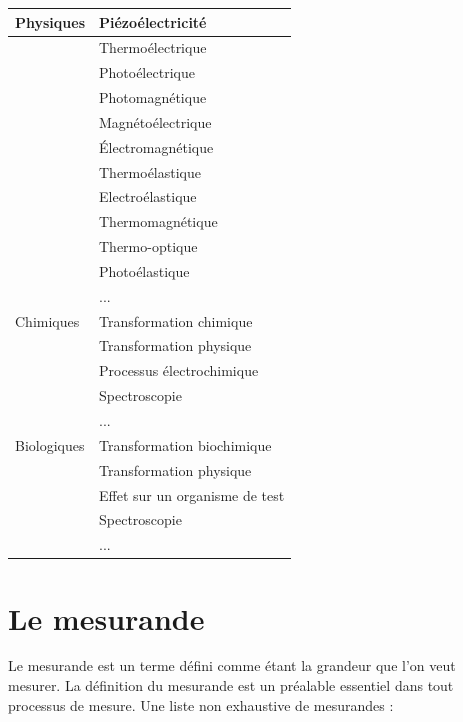 \begin {center}
\begin{tabular}{|p{4.2cm}|p{9.5cm}|}
\hline
Physiques &	Piézoélectricité \\
\hline
 & 	Thermoélectrique \\
\hline
  &	Photoélectrique \\
\hline
 & 	Photomagnétique \\
\hline
 & 	Magnétoélectrique \\
\hline
 & 	Électromagnétique \\
\hline
 & 	Thermoélastique \\
\hline
 & 	Electroélastique \\
\hline
 & 	Thermomagnétique \\
\hline
 & 	Thermo-optique \\
\hline
 & 	Photoélastique \\
\hline
 & 	... \\
\hline
Chimiques &	Transformation chimique \\
\hline
 & 	Transformation physique \\
\hline
 & 	Processus électrochimique \\
\hline
 & 	Spectroscopie \\
\hline
 & 	... \\
\hline
Biologiques &	Transformation biochimique \\
\hline
 & 	Transformation physique \\
\hline
 & 	Effet sur un organisme de test \\
\hline
 & 	Spectroscopie \\
\hline
 & 	... \\
\hline
\end{tabular}
\end{center}

\section{Le mesurande}
Le mesurande est un terme défini comme étant la grandeur que l'on veut mesurer. La définition du mesurande est un préalable essentiel dans tout processus de mesure. Une liste non exhaustive de mesurandes :

